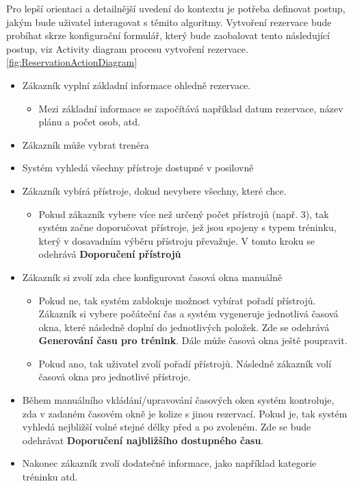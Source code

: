 Pro lepší orientaci a detailnější uvedení do kontextu je potřeba definovat postup, jakým bude uživatel interagovat s těmito algoritmy. Vytvoření rezervace bude probíhat skrze konfigurační formulář, který bude zaobalovat tento následující postup, viz Activity diagram procesu vytvoření rezervace. \ref{fig:ReservationActionDiagram}
\begin{itemize}
  \item Zákazník vyplní základní informace ohledně rezervace.
    \begin{itemize}
      \item Mezi základní informace se započítává například datum rezervace, název plánu a počet osob, atd.
    \end{itemize}
  \item Zákazník může vybrat trenéra
  \item Systém vyhledá všechny přístroje dostupné v posilovně
  \item Zákazník vybírá přístroje, dokud nevybere všechny, které chce.
    \begin{itemize}
        \item Pokud zákazník vybere více než určený počet přístrojů (např. 3), tak systém začne doporučovat přístroje, jež jsou spojeny s typem tréninku, který v dosavadním výběru přístroju převažuje. V tomto kroku se odehrává \textbf{Doporučení přístrojů}
    \end{itemize}
  \item Zákazník si zvolí zda chce konfigurovat časová okna manuálně
      \begin{itemize}
        \item Pokud ne, tak systém zablokuje možnost vybírat pořadí přístrojů. Zákazník si vybere počáteční čas a systém vygeneruje jednotlivá časová okna, které následně doplní do jednotlivých položek. Zde se odehrává \textbf{Generování času pro trénink}. Dále může časová okna ještě poupravit. 
        \item Pokud ano, tak uživatel zvolí pořadí přístrojů. Následně zákazník volí časová okna pro jednotlivé přístroje. 
    \end{itemize}
    
  \item Během manuálního vkládání/upravování časových oken systém kontroluje, zda v zadaném časovém okně je kolize s jinou rezervací. Pokud je, tak systém vyhledá nejbližší volné stejné délky před a po zvoleném. Zde se bude odehrávat \textbf{Doporučení najbližšího dostupného času}.
  \item Nakonec zákazník zvolí dodatečné informace, jako například kategorie tréninku atd.
\end{itemize}

